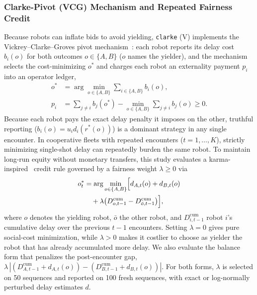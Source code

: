 \subsubsection{Clarke-Pivot (VCG) Mechanism and Repeated Fairness Credit}
Because robots can inflate bids to avoid yielding, \texttt{clarke} (V) implements the Vickrey--Clarke--Groves pivot mechanism~\cite{clarke1971multipart}: each robot reports its delay cost $b_i(o)$ for both outcomes $o \in \{A, B\}$ ($o$ names the yielder), and the mechanism selects the cost-minimizing $o^\ast$ and charges each robot an externality payment $p_i$ into an operator ledger,
\begin{equation}
\begin{aligned}
o^\ast &= \arg\min_{o\in\{A,B\}} \sum_{i\in\{A,B\}} b_i(o), \\
p_i &= \sum_{j\neq i} b_j(o^\ast) - \min_{o\in\{A,B\}} \sum_{j\neq i} b_j(o) \ge 0.
\end{aligned}
\label{eq:clarke}
\end{equation}
Because each robot pays the exact delay penalty it imposes on the other, truthful reporting ($b_i(o) = u_i d_i(r^\ast(o))$) is a dominant strategy in any single encounter.
In cooperative fleets with repeated encounters ($t = 1, \dots, K$), strictly minimizing single-shot delay can repeatedly burden the same robot. To maintain long-run equity without monetary transfers, this study evaluates a karma-inspired~\cite{censi2019karma,elokda2024karma} credit rule governed by a fairness weight $\lambda \ge 0$ via
\begin{equation}
\begin{aligned}
o_t^\ast &= \arg\min_{o\in\{A,B\}} \Bigl[d_{A,t}(o)+d_{B,t}(o) \\
&\quad + \lambda\bigl(D_{o,t-1}^{\mathrm{cum}} - D_{\bar{o},t-1}^{\mathrm{cum}}\bigr)\Bigr], 
\end{aligned}
\label{eq:karma}
\end{equation}
where $o$ denotes the yielding robot, $\bar{o}$ the other robot, and $D_{i,t-1}^{\mathrm{cum}}$ robot $i$'s cumulative delay over the previous $t-1$ encounters. Setting $\lambda = 0$ gives pure social-cost minimization, while $\lambda > 0$ makes it costlier to choose as yielder the robot that has already accumulated more delay. We also evaluate the balance form that penalizes the post-encounter gap, $\lambda\,|(D_{A,t-1}^{\mathrm{cum}}+d_{A,t}(o))-(D_{B,t-1}^{\mathrm{cum}}+d_{B,t}(o))|$. For both forms, $\lambda$ is selected on 50 sequences and reported on 100 fresh sequences, with exact or log-normally perturbed delay estimates $d$.

